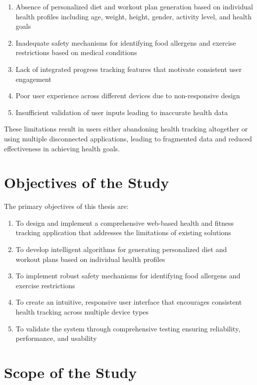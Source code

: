 \begin{enumerate}
    \item Absence of personalized diet and workout plan generation based on individual health profiles including age, weight, height, gender, activity level, and health goals
    \item Inadequate safety mechanisms for identifying food allergens and exercise restrictions based on medical conditions
    \item Lack of integrated progress tracking features that motivate consistent user engagement
    \item Poor user experience across different devices due to non-responsive design
    \item Insufficient validation of user inputs leading to inaccurate health data
\end{enumerate}

These limitations result in users either abandoning health tracking altogether or using multiple disconnected applications, leading to fragmented data and reduced effectiveness in achieving health goals.

\section{Objectives of the Study}

The primary objectives of this thesis are:

\begin{enumerate}
    \item To design and implement a comprehensive web-based health and fitness tracking application that addresses the limitations of existing solutions
    \item To develop intelligent algorithms for generating personalized diet and workout plans based on individual health profiles
    \item To implement robust safety mechanisms for identifying food allergens and exercise restrictions
    \item To create an intuitive, responsive user interface that encourages consistent health tracking across multiple device types
    \item To validate the system through comprehensive testing ensuring reliability, performance, and usability
\end{enumerate}

\section{Scope of the Study}

